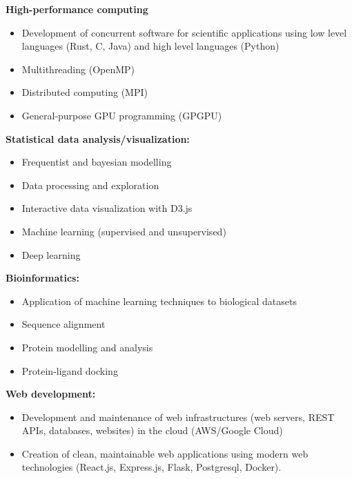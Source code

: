 \documentclass[11pt]{article}
\begin{document}
\textbf{High-performance computing}
\begin{itemize}
  \item Development of concurrent software for scientific applications using low level languages (Rust, C, Java) and high level languages (Python)
  \item Multithreading (OpenMP)
  \item Distributed computing (MPI)
  \item General-purpose GPU programming (GPGPU)
\end{itemize}

\textbf{Statistical data analysis/visualization:}
\begin{itemize}
  \item Frequentist and bayesian modelling
  \item Data processing and exploration
  \item Interactive data visualization with D3.js
	\item Machine learning (supervised and unsupervised)
	\item Deep learning
\end{itemize}


\textbf{Bioinformatics:}
\begin{itemize}
  \item Application of machine learning techniques to biological datasets
  \item Sequence alignment
  \item Protein modelling and analysis
	\item Protein-ligand docking
\end{itemize}


\textbf{Web development:}
\begin{itemize}
  \item Development and maintenance of web infrastructures (web servers, REST APIs, databases, websites) in the cloud (AWS/Google Cloud)
	\item Creation of clean, maintainable web applications using modern web technologies (React.js, Express.js, Flask, Postgresql, Docker).
\end{itemize}
\end{document}
